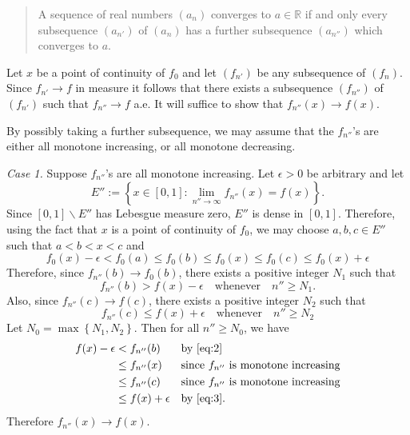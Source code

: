 \documentclass{exam}
\theoremstyle{problemstyle}
\newcommand{\1}[1]{\textbf{1}_{\left[#1\right]}} %
\begin{document}
\begin{questions}
\begin{solution}
\begin{quote}
  A sequence of real numbers $(a_{n})$ converges
  to $a\in \mathbb{R}$ if and only every subsequence $(a_{n'})$ of $(a_{n})$ has a
  further subsequence $(a_{n''})$ which converges to $a$.
\end{quote}


Let $x$ be a point of continuity of $f_{0}$ and let $(f_{n'})$ be any
subsequence of $(f_{n})$. Since $f_{n'}\to f$ in measure it follows that there
exists a subsequence $(f_{n''})$ of $(f_{n'})$ such that $f_{n''} \to f$ a.e. It
will suffice to show that $f_{n''}(x)\to f(x)$.

By possibly taking a further subsequence, we may assume that the $f_{n''}$'s are
either all monotone increasing, or all monotone decreasing.


\textit{Case 1.} Suppose $f_{n''}$'s are all monotone increasing. Let
$\epsilon>0$ be arbitrary and let
\begin{equation*}
  E'' := \left\{x\in [0,1] :\lim_{n''\to\infty} f_{n''}(x) = f(x) \right\}.
\end{equation*}
Since $[0,1]\backslash E''$ has Lebesgue measure zero, $E''$ is dense in
$[0,1]$. Therefore, using the fact that $x$ is a point of continuity of $f_{0}$,
we may choose $a,b,c\in E''$ such that $a<b<x<c$ and
\begin{equation}
  \label{eq:1}
  f_{0}(x)-\epsilon
  < f_{0}(a)
  \leq f_{0}(b)
  \leq f_{0}(x)
  \leq f_{0}(c)
  \leq f_{0}(x) + \epsilon
\end{equation}
Therefore, since $f_{n''}(b)\to f_{0}(b)$, there exists a positive integer
$N_{1}$ such that
\begin{equation}
  \label{eq:2}
  f_{n''}(b)> f(x)-\epsilon \quad \text{whenever} \quad n'' \geq N_{1}.
\end{equation}
Also, since $f_{n''}(c)\to f(c)$, there exists a positive integer $N_{2}$ such
that
\begin{equation}
  \label{eq:3}
  f_{n''}(c) \leq  f(x)+ \epsilon \quad \text{whenever} \quad n'' \geq N_{2}
\end{equation}
Let $N_{0}= \max \left\{N_{1},N_{2}\right\}$. Then for all $n'' \geq N_{0}$,  we
have
\begin{align*}
  f(x)-\epsilon
  &< f_{n''}(b)
    &&\text{by \eqref{eq:2}}\\
  &\leq f_{n''}(x)
    &&\text{since $f_{n''}$ is monotone increasing}\\
  &\leq f_{n''}(c)
    &&\text{since $f_{n''}$ is monotone increasing}\\
  &\leq f(x)+\epsilon
    &&\text{by \eqref{eq:3}}.
\end{align*}
Therefore $f_{n''}(x)\to f(x)$.


\end{solution}
\end{questions}
\end{document}
